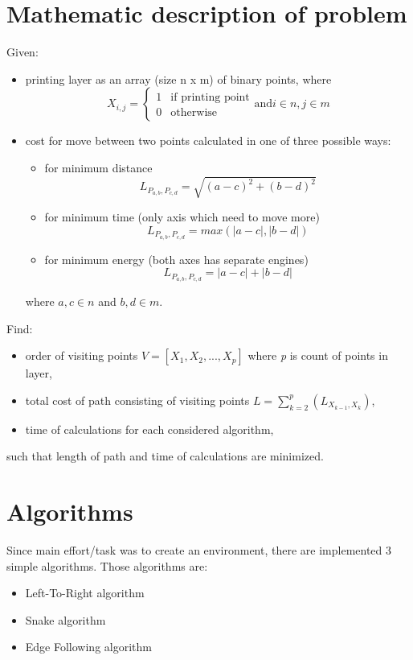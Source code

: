 \documentclass[]{article}
\begin{document}
\section{Mathematic description of problem}
Given:
\begin{itemize}
\item printing layer as an array (size n x m) of binary points, where
\begin{equation}
\label{layer}
X_{i,j}=\left\{ \begin{array}{rl}
 1 &\mbox{if printing point} \\
 0 &\mbox{otherwise}
       \end{array} \right. \mbox{and} i \in n, j \in m
\end{equation}
\item cost for move between two points calculated in one of three possible ways:
\begin{itemize}
\item for minimum distance
\begin{equation}
\label{distance_cost}
L_{P_{a,b}, P_{c,d}} = \sqrt{(a-c)^2+(b-d)^2}
\end{equation}
\item for minimum time (only axis which need to move more)
\begin{equation}
\label{time_cost}
L_{P_{a,b}, P_{c,d}} = max(|a-c|, |b-d|)
\end{equation}
\item for minimum energy (both axes has separate engines)
\begin{equation}
\label{energy_cost}
L_{P_{a,b}, P_{c,d}} = |a-c|+|b-d|
\end{equation}
\end{itemize}
where $a, c \in n$ and $b, d \in m$.
\end{itemize}

Find:
\begin{itemize}
\item order of visiting points $V=[X_1, X_2, ..., X_p]$ where \textit{p} is count of points in layer,
\item total cost of path consisting of visiting points $L=\sum\limits_{k=2}^p (L_{X_{k-1}, X_k})$,
\item time of calculations for each considered algorithm,
\end{itemize}
such that length of path and time of calculations are minimized.

\pagebreak
\section{Algorithms}
Since main effort/task was to create an environment, there are implemented 3 simple algorithms. Those algorithms are:
\begin{itemize}
\item Left-To-Right algorithm
\item Snake algorithm
\item Edge Following algorithm
\end{itemize}
\end{document}
